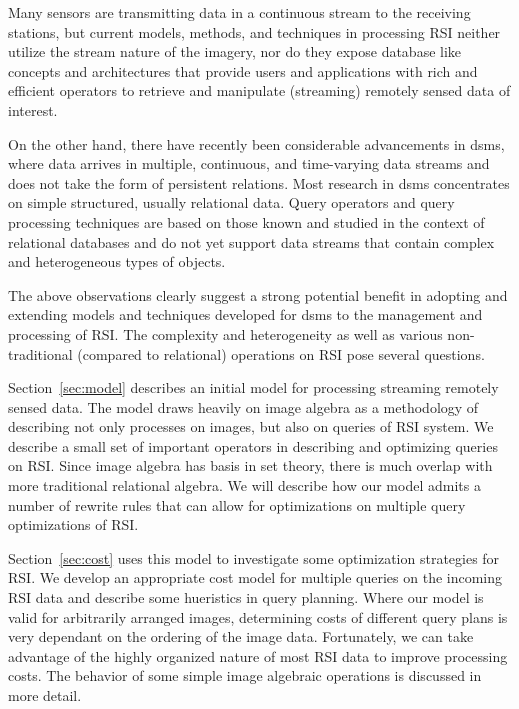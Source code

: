 \documentclass{vldb}
\begin{document}
Many sensors are transmitting data in a continuous stream to the
receiving stations, but current models, methods, and techniques in
processing \ac{RSI} neither utilize the stream nature of the imagery, nor
do they expose database like concepts and architectures that provide
users and applications with rich and efficient operators to retrieve
and manipulate (streaming) remotely sensed data of interest.

On the other hand, there have recently been considerable advancements
in \acl{dsms}, where data arrives in multiple, continuous, and
time-varying data streams and does not take the form of persistent
relations.  Most research in \ac{dsms} concentrates on simple structured,
usually relational data.  Query operators and query processing
techniques are based on those known and studied in the context of
relational databases and do not yet support data streams that contain
complex and heterogeneous types of objects.

The above observations clearly suggest a strong potential benefit in
adopting and extending models and techniques developed for \ac{dsms} to the
management and processing of \acl{RSI}. The complexity and
heterogeneity as well as various non-traditional (compared to
relational) operations on \ac{RSI} pose several questions.

Section~\ref{sec:model} describes an initial model for processing
streaming remotely sensed data.  The model draws heavily on image
algebra as a methodology of describing not only processes on images,
but also on queries of \ac{RSI} system.  We describe a small set of
important operators in describing and optimizing queries on \ac{RSI}.
Since image algebra has basis in set theory, there is much overlap
with more traditional relational algebra.  We will describe how our
model admits a number of rewrite rules that can allow for
optimizations on multiple query optimizations of \ac{RSI}.

Section~\ref{sec:cost} uses this model to investigate some
optimization strategies for \ac{RSI}.  We develop an appropriate cost
model for multiple queries on the incoming \ac{RSI} data and describe
some hueristics in query planning.  Where our model is valid for
arbitrarily arranged images, determining costs of different query
plans is very dependant on the ordering of the image data.
Fortunately, we can take advantage of the highly organized nature of
most \ac{RSI} data to improve processing costs.  The behavior of some
simple image algebraic operations is discussed in more detail.
\end{document}

